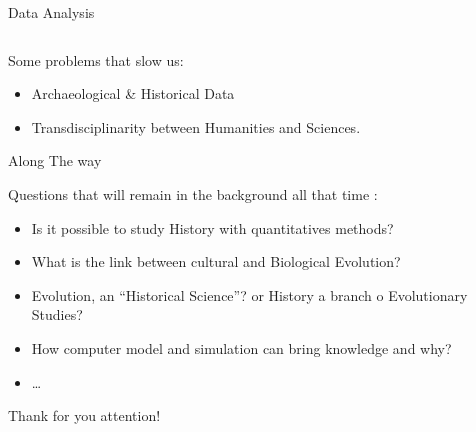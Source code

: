 \documentclass[8pt, handout=show,notes=show]{beamer}
\begin{document}
\begin{frame}{Data Analysis}
\begin{columns}
\begin{column}{.4\textwidth}
	\end{column}
    \end{columns}

    
    \begin{alertblock}
	{Some problems that slow us:}
	\begin{itemize}
	    \item Archaeological \& Historical Data
	    \item Transdisciplinarity between Humanities and Sciences.
	\end{itemize}
    \end{alertblock}

\end{frame}
\begin{frame}{Along The way}

    Questions that will remain in the background all that time :

    \begin{itemize}
	\item Is it possible to study History with quantitatives methods?
	\item What is the link between cultural and Biological Evolution?
	\item Evolution, an ``Historical Science''? or History a branch o Evolutionary Studies? 
	\item How computer model and simulation can bring knowledge and why?
	\item \ldots
    \end{itemize}
    
\end{frame}

\begin{frame}
    \Huge
    Thank for you attention!
\end{frame}
\end{document}
